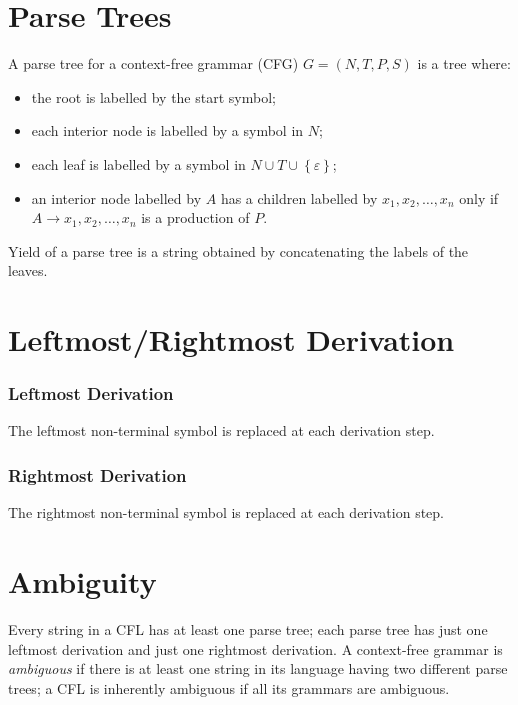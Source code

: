 \section{Parse Trees}
A parse tree for a context-free grammar (CFG) $G = (N, T, P, S)$ is a tree where:
\begin{itemize}
    \item the root is labelled by the start symbol;
    \item each interior node is labelled by a symbol in $N$;
    \item each leaf is labelled by a symbol in $N \cup T \cup \left\{\varepsilon\right\}$;
    \item an interior node labelled by $A$ has a children labelled by $x_1, x_2, \ldots, x_n$ only if $A \to x_1, x_2, \ldots, x_n$ is a production of $P$.
\end{itemize}
Yield of a parse tree is a string obtained by concatenating the labels of the leaves.

\section{Leftmost/Rightmost Derivation}
\subsubsection{Leftmost Derivation}
The leftmost non-terminal symbol is replaced at each derivation step.
\subsubsection{Rightmost Derivation}
The rightmost non-terminal symbol is replaced at each derivation step.

\section{Ambiguity}
Every string in a CFL has at least one parse tree; each parse tree has just one leftmost derivation and just one rightmost derivation.
A context-free grammar is \emph{ambiguous} if there is at least one string in its language having two different parse trees; a CFL is inherently ambiguous if all its grammars are ambiguous.

